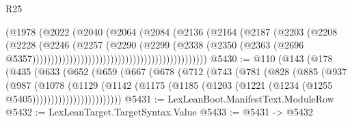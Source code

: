 \begin{lexlean}{R25}
\begin{coremodule}
                                                            (@1978
                                                              (@2022
                                                                (@2040
                                                                  (@2064
                                                                    (@2084
                                                                      (@2136
                                                                        (@2164
                                                                          (@2187
                                                                            (@2203
                                                                              (@2208
                                                                                (@2228
                                                                                  (@2246
                                                                                    (@2257
                                                                                      (@2290
                                                                                        (@2299
                                                                                          (@2338
                                                                                            (@2350
                                                                                              (@2363
                                                                                                (@2696
                                                                                                  @5357)))))))))))))))))))))))))))))))))))))))))))))))
@5430 := @110
    (@143
      (@178
        (@435
          (@633
            (@652
              (@659
                (@667
                  (@678
                    (@712
                      (@743
                        (@781
                          (@828
                            (@885
                              (@937
                                (@987
                                  (@1078
                                    (@1129
                                      (@1142
                                        (@1175
                                          (@1185
                                            (@1203
                                              (@1221 (@1234 (@1255 @5405))))))))))))))))))))))))
@5431 := LexLeanBoot.ManifestText.ModuleRow
@5432 := LexLeanTarget.TargetSyntax.Value
@5433 := @5431 -> @5432

\end{coremodule}
\end{lexlean}
